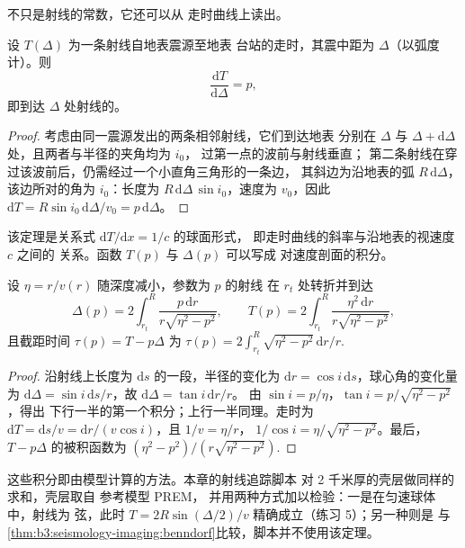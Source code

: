 不只是射线的常数，它还可以从
走时曲线上读出。

\begin{theorem}[走时曲线的斜率]\label{thm:b3:seismology-imaging:benndorf}
设 $T(\Delta)$ 为一条射线自地表震源至地表
台站的走时，其震中距为 $\Delta$（以弧度计）。则
\[
  \frac{\mathrm dT}{\mathrm d\Delta} = p ,
\]
即到达 $\Delta$ 处射线的。
\end{theorem}

\begin{proof}
考虑由同一震源发出的两条相邻射线，它们到达地表
分别在 $\Delta$ 与 $\Delta + \mathrm d\Delta$ 处，且两者与半径的夹角均为 $i_0$，
过第一点的波前与射线垂直；
第二条射线在穿过该波前后，仍需经过一个小直角三角形的一条边，
其斜边为沿地表的弧 $R\,\mathrm d\Delta$，
该边所对的角为 $i_0$：长度为
$R\,\mathrm d\Delta\,\sin i_0$，速度为 $v_0$，因此
$\mathrm dT = R\sin i_0\,\mathrm d\Delta/v_0 = p\,\mathrm d\Delta$。
\end{proof}

该定理是关系式 $\mathrm dT/\mathrm dx = 1/c$ 的球面形式，
即走时曲线的斜率与沿地表的视速度 $c$ 之间的
关系。函数 $T(p)$ 与 $\Delta(p)$ 可以写成
对速度剖面的积分。

\begin{proposition}[作为积分的走时与距离]\label{prop:b3:seismology-imaging:integrals}
设 $\eta = r/v(r)$ 随深度减小，参数为 $p$ 的射线
在 $r_t$ 处转折并到达
\[
  \Delta(p) = 2\int_{r_t}^{R}\frac{p\,\mathrm dr}{r\sqrt{\eta^2 - p^2}},
  \qquad
  T(p) = 2\int_{r_t}^{R}\frac{\eta^2\,\mathrm dr}{r\sqrt{\eta^2 - p^2}},
\]
且截距时间 $\tau(p) = T - p\Delta$ 为
$\tau(p) = 2\int_{r_t}^{R}\sqrt{\eta^2 - p^2}\,\mathrm dr/r$.
\end{proposition}

\begin{proof}
沿射线上长度为 $\mathrm ds$ 的一段，半径的变化为
$\mathrm dr = \cos i\,\mathrm ds$，球心角的变化量为
$\mathrm d\Delta = \sin i\,\mathrm ds/r$，故 $\mathrm d\Delta = \tan i\,\mathrm dr/r$。
由 $\sin i = p/\eta$，$\tan i = p/\sqrt{\eta^2 - p^2}$，得出
下行一半的第一个积分；上行一半同理。走时为
$\mathrm dT = \mathrm ds/v = \mathrm dr/(v\cos i)$，且 $1/v = \eta/r$，
$1/\cos i = \eta/\sqrt{\eta^2 - p^2}$。最后，$T - p\Delta$ 的被积函数为
$(\eta^2 - p^2)/(r\sqrt{\eta^2 - p^2})$.
\end{proof}

这些积分即由模型计算的方法。本章的射线追踪脚本
对 2 千米厚的壳层做同样的求和，壳层取自
参考模型 PREM， %
并用两种方式加以检验：一是在匀速球体中，射线为
弦，此时 $T = 2R\sin(\Delta/2)/v$ 精确成立（练习 5）；另一种则是
与\cref{thm:b3:seismology-imaging:benndorf}比较，脚本并不使用该定理。

